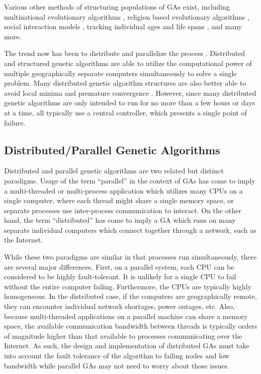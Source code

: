     Various other methods of structuring populations of GAs exist, including
      multinational evolutionary algorithms \cite{Ursem2000}, religion based
      evolutionary algorithms \cite{Thomsen2000}, social interaction models
      \cite{Al-madi2008}, tracking individual ages and life spans
      \cite{Kubota1997}, and many more.

    The trend now has been to distribute and parallelize the process
      \cite{Tomassini1999, DAmbrosio2006, Kim2006, Cantu-Paz2007, Cantor2010}. 
    Distributed and structured genetic algorithms are able to utilize the
      computational power of multiple geographically separate computers
      simultaneously to solve a single problem. 
    Many distributed genetic algorithm structures are also better able to avoid
      local minima and premature convergence \cite{Artyushenko2009, Alba2005}.
    However, since many distributed genetic algorithms are only intended to run
      for no more than a few hours or days at a time, all typically use a central
      controller, which presents a single point of failure. 

  \subsection{Distributed/Parallel Genetic Algorithms} %
    Distributed and parallel genetic algorithms are two related but distinct
      paradigms. 
    Usage of the term ``parallel'' in the context of GAs has come to imply a
      multi-threaded or multi-process application which utilizes many CPUs on a
      single computer, where each thread might share a single memory space, or
      separate processes use inter-process communication to interact. 
    On the other hand, the term ``distributed'' has come to imply a GA which
      runs on many separate individual computers which connect together through a
      network, such as the Internet. 

    While these two paradigms are similar in that processes run simultaneously,
      there are several major differences.
    First, on a parallel system, each CPU can be considered to be highly
      fault-tolerant.
    It is unlikely for a single CPU to fail without the entire computer failing.
    Furthermore, the CPUs are typically highly homogeneous.
    In the distributed case, if the computers are geographically remote, they
      can encounter individual network shortages, power outages, etc.
    Also, because multi-threaded applications on a parallel machine can share a
      memory space, the available communication bandwidth between threads is
      typically orders of magnitude higher than that available to processes
      communicating over the Internet. 
    As such, the design and implementation of distributed GAs must take into
      account the fault tolerance of the algorithm to failing nodes and low
      bandwidth while parallel GAs may not need to worry about those issues.

